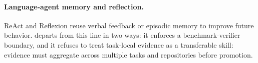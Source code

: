 \paragraph{Language-agent memory and reflection.}
ReAct \citep{react2023} and Reflexion \citep{reflexion2023} reuse verbal
feedback or episodic memory to improve future behavior. \method{} departs from
this line in two ways: it enforces a benchmark-verifier boundary, and it
refuses to treat task-local evidence as a transferable skill: evidence must
aggregate across multiple tasks and repositories before promotion.
